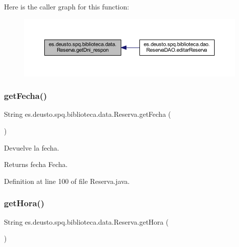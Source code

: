 Here is the caller graph for this function\+:
\nopagebreak
\begin{figure}[H]
\begin{center}
\leavevmode
\includegraphics[width=350pt]{classes_1_1deusto_1_1spq_1_1biblioteca_1_1data_1_1_reserva_a6c02bf1ca4b29a4a8ac6df9ac89faa9b_icgraph}
\end{center}
\end{figure}
\mbox{\label{classes_1_1deusto_1_1spq_1_1biblioteca_1_1data_1_1_reserva_ae3c4ad48c63acf8f7b2a8cb85cb32266}} 
\subsubsection{\texorpdfstring{get\+Fecha()}{getFecha()}}
{\footnotesize\ttfamily String es.\+deusto.\+spq.\+biblioteca.\+data.\+Reserva.\+get\+Fecha (\begin{DoxyParamCaption}{ }\end{DoxyParamCaption})}

Devuelve la fecha. \begin{DoxyReturn}{Returns}
fecha Fecha. 
\end{DoxyReturn}


Definition at line 100 of file Reserva.\+java.

\mbox{\label{classes_1_1deusto_1_1spq_1_1biblioteca_1_1data_1_1_reserva_a9e26c394bd2b92fc333d90307a5ffe2a}} 
\subsubsection{\texorpdfstring{get\+Hora()}{getHora()}}
{\footnotesize\ttfamily String es.\+deusto.\+spq.\+biblioteca.\+data.\+Reserva.\+get\+Hora (\begin{DoxyParamCaption}{ }\end{DoxyParamCaption})}

